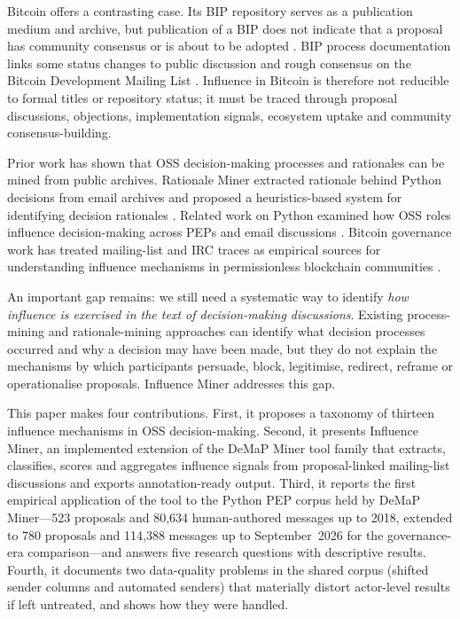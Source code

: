 \documentclass[sigconf,screen]{acmart}
\begin{document}
Bitcoin offers a contrasting case. Its BIP repository serves as a publication medium and archive, but publication of a BIP does not indicate that a proposal has community consensus or is about to be adopted \cite{bitcoinbips}. BIP process documentation links some status changes to public discussion and rough consensus on the Bitcoin Development Mailing List \cite{bip3}. Influence in Bitcoin is therefore not reducible to formal titles or repository status; it must be traced through proposal discussions, objections, implementation signals, ecosystem uptake and community consensus-building.

Prior work has shown that OSS decision-making processes and rationales can be mined from public archives. Rationale Miner extracted rationale behind Python decisions from email archives and proposed a heuristics-based system for identifying decision rationales \cite{sharma2021rationale,sharma2024rationale}. Related work on Python examined how OSS roles influence decision-making across PEPs and email discussions \cite{sharma2021roles}. Bitcoin governance work has treated mailing-list and IRC traces as empirical sources for understanding influence mechanisms in permissionless blockchain communities \cite{thapa2021bitcoin}.

An important gap remains: we still need a systematic way to identify \emph{how influence is exercised in the text of decision-making discussions}. Existing process-mining and rationale-mining approaches can identify what decision processes occurred and why a decision may have been made, but they do not explain the mechanisms by which participants persuade, block, legitimise, redirect, reframe or operationalise proposals. Influence Miner addresses this gap.

This paper makes four contributions. First, it proposes a taxonomy of thirteen influence mechanisms in OSS decision-making. Second, it presents Influence Miner, an implemented extension of the DeMaP Miner tool family that extracts, classifies, scores and aggregates influence signals from proposal-linked mailing-list discussions and exports annotation-ready output. Third, it reports the first empirical application of the tool to the Python PEP corpus held by DeMaP Miner---523 proposals and 80,634 human-authored messages up to 2018, extended to 780 proposals and 114,388 messages up to September~2026 for the governance-era comparison---and answers five research questions with descriptive results. Fourth, it documents two data-quality problems in the shared corpus (shifted sender columns and automated senders) that materially distort actor-level results if left untreated, and shows how they were handled.
\end{document}
